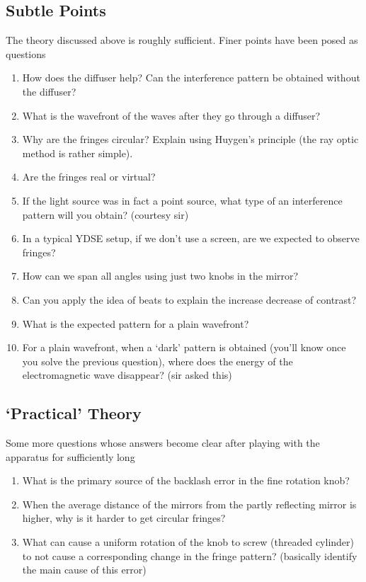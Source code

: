 	\subsection{Subtle Points}
		The theory discussed above is roughly sufficient. Finer points have been posed as questions %
		\begin{enumerate}
			\item How does the diffuser help? Can the interference pattern be obtained without the diffuser?		
			\item What is the wavefront of the waves after they go through a diffuser?
			\item Why are the fringes circular? Explain using Huygen's principle (the ray optic method is rather simple).
			\item Are the fringes real or virtual?
			\item If the light source was in fact a point source, what type of an interference pattern will you obtain? (courtesy sir)
			\item In a typical YDSE setup, if we don't use a screen, are we expected to observe fringes?
			\item How can we span all angles using just two knobs in the mirror?
			\item Can you apply the idea of beats to explain the increase decrease of contrast?
			\item What is the expected pattern for a plain wavefront?
			\item For a plain wavefront, when a `dark' pattern is obtained (you'll know once you solve the previous question), where does the energy of the electromagnetic wave disappear? (sir asked this)
		\end{enumerate}
	
	\subsection{`Practical' Theory}
		Some more questions whose answers become clear after playing with the apparatus for sufficiently long
		\begin{enumerate}
			\item What is the primary source of the backlash error in the fine rotation knob?
			\item When the average distance of the mirrors from the partly reflecting mirror is higher, why is it harder to get circular fringes?
			\item What can cause a uniform rotation of the knob to screw (threaded cylinder) to not cause a corresponding change in the fringe pattern? (basically identify the main cause of this error)
		\end{enumerate}

